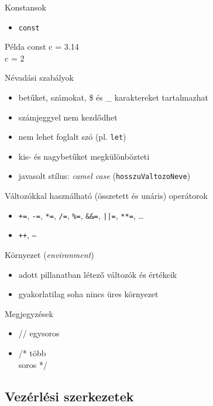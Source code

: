 \documentclass[usenames,dvipsnames,aspectratio=169]{beamer}
\begin{document}
\begin{frame}
    Konstansok
    \begin{itemize}
        \item \texttt{const}
    \end{itemize}
    \begin{exampleblock}{Példa}
        const c = 3.14\\
        c = 2 
    \end{exampleblock}
    \vfill
    Névadási szabályok
    \begin{itemize}
        \item betűket, számokat, \$ és \_ karaktereket tartalmazhat
        \item számjeggyel nem kezdődhet
        \item nem lehet foglalt szó (pl. \texttt{let})
        \item kis- és nagybetűket megkülönbözteti
        \item javasolt stílus: \emph{camel case} (\texttt{hosszuValtozoNeve})
    \end{itemize}
\end{frame}

\begin{frame}
    Változókkal használható (összetett és unáris) operátorok
    \begin{itemize}
        \item \texttt{+=}, \texttt{-=}, \texttt{*=}, \texttt{/=}, \texttt{\%=}, \texttt{\&\&=}, \texttt{||=}, \texttt{**=}, \dots 
        \item \texttt{++}, \texttt{--}
    \end{itemize}
    \vfill
    Környezet (\emph{environment})
    \begin{itemize}
        \item adott pillanatban létező változók és értékeik
        \item gyakorlatilag soha nincs üres környezet
    \end{itemize}
    \vfill
    Megjegyzések
    \begin{itemize}
        \item // egysoros
        \item /* több \\ \quad soros */
    \end{itemize}
\end{frame}

\subsection{Vezérlési szerkezetek}
\end{document}
